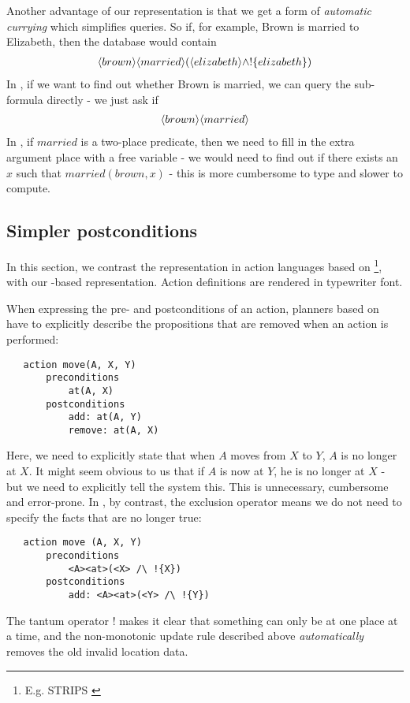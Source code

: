 Another advantage of our representation is that we get a form of \emph{automatic currying} which simplifies queries.
So if, for example, Brown is married to Elizabeth, then the database would contain 
\begin{eqnarray*}
\langle brown \rangle \langle married \rangle (\langle elizabeth \rangle \land ! \{elizabeth\})
\end{eqnarray*}
In \cathoristic{}, if we want to find out whether Brown is married, we can query the sub-formula directly -  we just ask if 
\begin{eqnarray*}
\langle brown \rangle \langle married \rangle \end{eqnarray*}
In \fol, if $married$ is a two-place predicate, then we need to fill in the extra argument place with a free variable - we would need to find out if there exists an $x$ such that $married(brown, x)$ - this is more cumbersome to type and slower to compute. 

\subsection{Simpler postconditions}

In this section, we contrast the representation in action languages based on \fol{}\footnote{E.g. STRIPS \cite{strips}}, with our \cathoristic{}-based representation.
Action definitions are rendered in typewriter font.

When expressing the pre- and postconditions of an action, planners
based on \fol{} have to explicitly describe the propositions that
are removed when an action is performed:
\begin{verbatim}
   action move(A, X, Y)
       preconditions
           at(A, X)
       postconditions
           add: at(A, Y) 
           remove: at(A, X)
\end{verbatim}
Here, we need to explicitly state that when $A$ moves from $X$ to $Y$, $A$ is no longer at $X$. It might seem obvious to us that if $A$ is now at $Y$, he is no longer at $X$ - but we need to explicitly tell the system this. This is unnecessary, cumbersome and error-prone. In \cathoristic{}, by contrast, the exclusion operator means we do not need to specify the facts that are no longer true:
\begin{verbatim}
   action move (A, X, Y)
       preconditions
           <A><at>(<X> /\ !{X})
       postconditions
           add: <A><at>(<Y> /\ !{Y})
\end{verbatim}
The tantum operator $!$ makes it clear that something can only be at one
place at a time, and the non-monotonic update rule described above
\emph{automatically} removes the old invalid location data.

